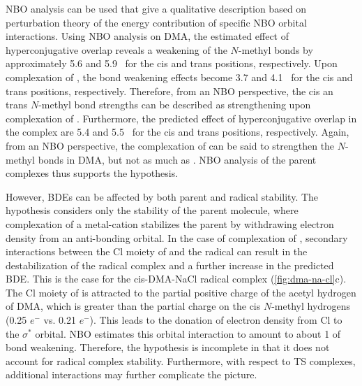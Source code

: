 NBO analysis can be used that give a qualitative description based on
perturbation theory of the energy contribution of specific NBO orbital
interactions.\cite{Weinhold2016} Using NBO analysis on DMA, the estimated effect
of hyperconjugative overlap reveals a weakening of the $N$-methyl  bonds
by approximately 5.6 and 5.9 \kcalmol\ for the cis and trans positions,
respectively. Upon complexation of , the bond weakening effects become
3.7 and 4.1 \kcalmol\ for the cis and trans positions, respectively. Therefore,
from an NBO perspective, the cis an trans $N$-methyl bond strengths can be
described as strengthening upon complexation of . Furthermore, the
predicted effect of hyperconjugative overlap in the  complex are
5.4 and 5.5 \kcalmol\ for the cis and trans positions, respectively. Again, from
an NBO perspective, the complexation of  can be said to strengthen the
$N$-methyl  bonds in DMA, but not as much as . NBO analysis of
the parent complexes thus supports the hypothesis.

However, BDEs can be affected by both parent and radical stability. The
hypothesis considers only the stability of the parent molecule, where
complexation of a metal-cation stabilizes the parent by withdrawing electron
density from an anti-bonding orbital. In the case of complexation of ,
secondary interactions between the Cl moiety of  and the radical can
result in the destabilization of the radical complex and a further increase in
the predicted  BDE. This is the case for the cis-DMA-NaCl radical
complex (\ref{fig:dma-na-cl}c). The Cl moiety of  is attracted to the
partial positive charge of the acetyl hydrogen of DMA, which is greater than the
partial charge on the cis $N$-methyl hydrogens (0.25 $e^-$ vs. 0.21 $e^-$). This
leads to the donation of electron density from Cl to the  $\sigma^*$
orbital. NBO estimates this orbital interaction to amount to about 1 \kcalmol of
bond weakening. Therefore, the hypothesis is incomplete in that it does not
account for radical complex stability. Furthermore, with respect to TS
complexes, additional interactions may further complicate the picture.


